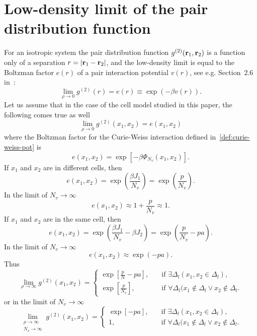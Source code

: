 \section{\label{sec:low-dens}Low-density limit of the pair distribution function}
For an isotropic system the pair distribution function $g^{(2)}(\vb{r}_1, \vb{r}_2)$ is a function only of a separation $r = \abs{\vb{r}_1 - \vb{r}_2}$, and the low-density limit is equal to the Boltzman factor $e(r)$ of a pair interaction potential $v(r)$, see e.g. Section~2.6 in~\cite{hansen2013theory}:
\begin{equation*}
	\lim_{\rho \to 0} g^{(2)}(r) = e(r) \equiv \exp(-\beta v(r)).
\end{equation*}
Let us assume that in the case of the cell model studied in this paper, the following comes true as well
\begin{equation}
	\lim_{\rho \to 0} g^{(2)}(x_1, x_2) = e(x_1, x_2)
\end{equation}
where the Boltzman factor for the Curie-Weiss interaction defined in~\eqref{def:curie-weiss-pot} is
\begin{equation*}
	e(x_1, x_2) = \exp\left[-\beta \Phi_{N_v}(x_1, x_2)\right].
\end{equation*}
If $x_1$ and $x_2$ are in different cells, then
\begin{equation*}
	e(x_1, x_2) = \exp(\frac{\beta J_1}{N_v}) = \exp(\frac{p}{N_v}).
\end{equation*}
In the limit of $N_v \to \infty$
\begin{equation*}
	e(x_1, x_2) \approx 1 + \frac{p}{N_v} \approx 1.
\end{equation*}
If $x_1$ and $x_2$ are in the same cell, then
\begin{equation*}
	e(x_1, x_2) = \exp(\frac{\beta J_1}{N_v} - \beta J_2) = \exp(\frac{p}{N_v} - pa). 
\end{equation*}
In the limit of $N_v \to \infty$
\begin{equation*}
	e(x_1, x_2) \approx \exp(-pa).
\end{equation*}
Thus 
\begin{equation*}
	\lim_{\rho \to \infty} g^{(2)}(x_1, x_2) = \left\{
		\begin{array}{ll}
			\exp[\frac{p}{N} - pa], \quad & \text{if } \exists \Delta_l (x_1, x_2 \in \Delta_l),
			\\
			\exp[\frac{p}{N_v}], \quad & \text{if } \forall \Delta_l (x_1 \notin \Delta_l \lor x_2 \notin \Delta_l.
		\end{array}
	\right.
\end{equation*}
or in the limit of $N_v \to \infty$
\begin{equation}
	\label{eq:g2_low_limit}
	\lim_{\substack{\rho \to \infty \\ N_v \to \infty}} g^{(2)}(x_1, x_2) = \left\{
	\begin{array}{ll}
		\exp[- pa], \quad & \text{if } \exists \Delta_l (x_1, x_2 \in \Delta_l),
		\\
		1, \quad & \text{if } \forall \Delta_l (x_1 \notin \Delta_l \lor x_2 \notin \Delta_l.
	\end{array}
	\right.
\end{equation}